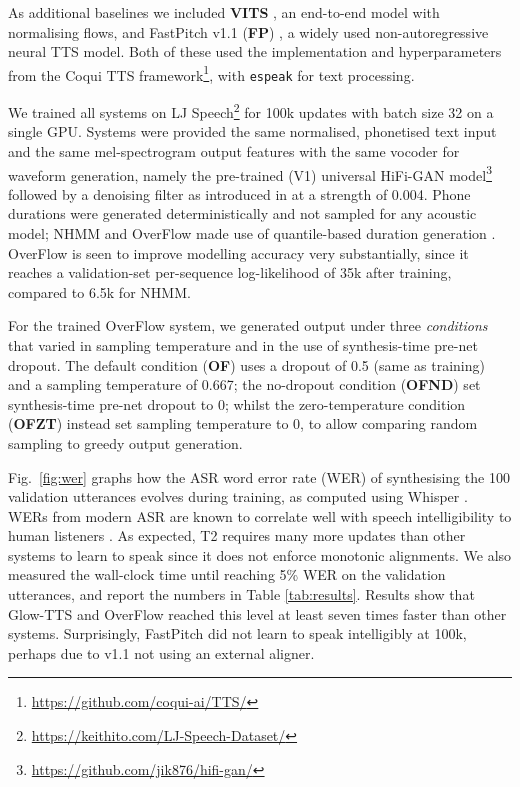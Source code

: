 \documentclass[british]{INTERSPEECH2023_arxiv}
\begin{document}
As additional baselines we included \textbf{VITS} \cite{kim2021vits}, an end-to-end model with normalising flows, and FastPitch v1.1 (\textbf{FP}) \cite{lancucki2021fastpitch,badlani2022one}, a widely used non-autoregressive neural TTS model.
Both of these used the implementation and hyperparameters from the Coqui TTS framework\footnote{\href{https://github.com/coqui-ai/TTS/}{https://github.com/coqui-ai/TTS/}}, with \texttt{espeak} for text processing.

We trained all systems on LJ Speech\footnote{\href{https://keithito.com/LJ-Speech-Dataset/}{https://keithito.com/LJ-Speech-Dataset/}} for 100k updates with batch size 32 on a single GPU.
Systems were provided the same normalised, phonetised text input and the same mel-spectrogram output features with the same vocoder for waveform generation, namely the pre-trained (V1) universal HiFi-GAN \cite{kong2020hifi} model\footnote{\href{https://github.com/jik876/hifi-gan/}{https://github.com/jik876/hifi-gan/}}
followed by a denoising filter as introduced in \cite{prenger2019waveglow} at a strength of 0.004.
Phone durations were generated deterministically and not sampled for any acoustic model; NHMM and OverFlow made use of quantile-based duration generation \cite{ronanki2016median,henter2017nonparametric}.
OverFlow is seen to improve modelling accuracy very substantially, since it reaches a validation-set per-sequence log-likelihood of 35k after training, compared to 6.5k for NHMM.

For the trained OverFlow system, we generated output 
under three \emph{conditions} that varied in sampling temperature and in the use of synthesis-time pre-net dropout.
The default condition (\textbf{OF}) uses a dropout of 0.5 (same as training) and a sampling temperature of 0.667; the no-dropout condition (\textbf{OFND}) set synthesis-time pre-net dropout to 0; whilst the zero-temperature condition (\textbf{OFZT}) instead set sampling temperature to 0, to allow comparing random sampling to greedy output generation.

Fig.\ \ref{fig:wer} graphs how the ASR word error rate (WER) of synthesising the 100 validation utterances evolves during training, as computed using Whisper
\cite{radford2022robust}.
WERs from modern ASR are known to correlate well with speech intelligibility to human listeners \cite{taylor2021confidence}.
As expected, T2 requires many more updates than other systems to learn to speak since it does not enforce monotonic alignments.
We also measured the wall-clock time until reaching 5\% WER on the validation utterances, and report the numbers in Table \ref{tab:results}.
Results show that Glow-TTS and OverFlow reached this level at least seven times faster than other systems.
Surprisingly, FastPitch did not learn to speak intelligibly at 100k, perhaps due to v1.1 not using an external aligner.
\end{document}
